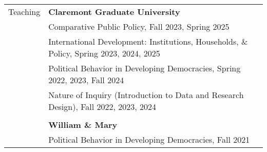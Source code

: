 \documentclass[letterpaper, 10.5pt]{article}
\begin{document}
\begin{longtable}{p{1.5in}p{5in}}
% 
% 
%   
%   
%
%  
% 
% 
%
%
% 
{{Teaching}}  & \textbf{Claremont Graduate University} \\
& Comparative Public Policy,  Fall 2023, Spring 2025\\
&International Development: Institutions, Households, \& Policy, Spring 2023, 2024, 2025\\
&Political Behavior in Developing Democracies, Spring 2022, 2023, Fall 2024\\
&Nature of Inquiry (Introduction to Data and Research Design), Fall 2022, 2023, 2024 \\
&\\


& \textbf{William \& Mary} \\
&Political Behavior in Developing Democracies, Fall 2021 \\



\end{longtable}
\end{document}
